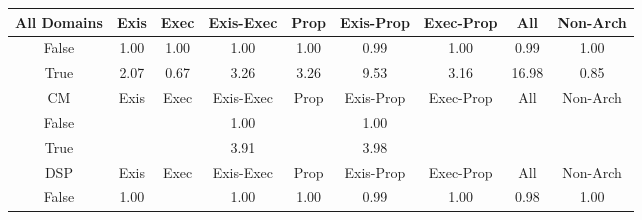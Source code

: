 \begin{tabular}{|c||c|c|c|c|c|c|c|c|}
\hline
All Domains & Exis & Exec & Exis-Exec & Prop & Exis-Prop & Exec-Prop & All & Non-Arch \\ 
\hline
False & \cellcolor[rgb]{0.9098003258523913,0.8390548757013185,0.4198136374622318} 1.00 & \cellcolor[rgb]{0.9099979152590225,0.8399990124911159,0.42} 1.00 & \cellcolor[rgb]{0.909579527331874,0.8380097627042031,0.4196075588430823} 1.00 & \cellcolor[rgb]{0.9095782732232046,0.8380038265898347,0.4196063883416576} 1.00 & \cellcolor[rgb]{0.9084119335244307,0.8324831520156388,0.418517804622802} 0.99 & \cellcolor[rgb]{0.909597261355663,0.8380937037501378,0.4196241105986187} 1.00 & \cellcolor[rgb]{0.9070239983549943,0.8259135922136394,0.41722239846466125} 0.99 & \cellcolor[rgb]{0.9099990267262618,0.8399995389755976,0.42} 1.00 \\ 
\hline
True & \cellcolor[rgb]{0.8985580364382211,0.8345801225233678,0.41999999999999993} 2.07 & \cellcolor[rgb]{0.8076806931252214,0.3556886141260475,0.3245019802502066} 0.67 & \cellcolor[rgb]{0.8859055791396231,0.8285868532766635,0.42} 3.26 & \cellcolor[rgb]{0.885833714725178,0.8285528122382421,0.42} 3.26 & \cellcolor[rgb]{0.8189987413756334,0.7968941406516158,0.42} 9.53 & \cellcolor[rgb]{0.8869217950916019,0.8290682187276008,0.42} 3.16 & \cellcolor[rgb]{0.7394656429500938,0.7592205677132023,0.42} 16.98 & \cellcolor[rgb]{0.8622316223548142,0.6138963458127871,0.37541618086449324} 0.85 \\ 
\hline
\hline
CM & Exis & Exec & Exis-Exec & Prop & Exis-Prop & Exec-Prop & All & Non-Arch \\ 
\hline
False &  &  & \cellcolor[rgb]{0.9085452583890034,0.8331142230412822,0.41864224116306975} 1.00 &  & \cellcolor[rgb]{0.9085107178513718,0.8329507311631598,0.418610003327947} 1.00 &  &  &  \\ 
\hline
True &  &  & \cellcolor[rgb]{0.8789684600945746,0.8253008495184827,0.42} 3.91 &  & \cellcolor[rgb]{0.8782316652825166,0.824951841449613,0.42} 3.98 &  &  &  \\ 
\hline
\hline
DSP & Exis & Exec & Exis-Exec & Prop & Exis-Prop & Exec-Prop & All & Non-Arch \\ 
\hline
False & \cellcolor[rgb]{0.909381846425987,0.837074073083005,0.4194230566642545} 1.00 &  & \cellcolor[rgb]{0.9087915026582856,0.8342797792492178,0.41887206914773306} 1.00 & \cellcolor[rgb]{0.9092624589337794,0.8365089722865557,0.4193116283381941} 1.00 & \cellcolor[rgb]{0.9074251698937363,0.8278124708303517,0.41759682523415387} 0.99 & \cellcolor[rgb]{0.908833279232414,0.8344775217000923,0.41891106061691963} 1.00 & \cellcolor[rgb]{0.9027818175927148,0.8058339366055164,0.4132630297532004} 0.98 & \cellcolor[rgb]{0.9099967522929714,0.83999846161246,0.42} 1.00 \\ 

\end{tabular}
